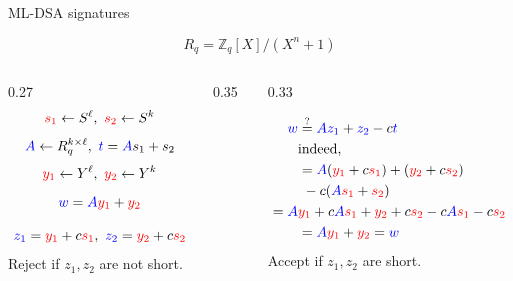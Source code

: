 \documentclass{beamer}
\theoremstyle{customstyle}
\begin{document}
\begin{frame}{ML-DSA signatures}
\scriptsize

$$R_q = \mathbb{Z}_q[X]/(X^n+1)$$

\begin{columns}[c,onlytextwidth]

\begin{column}{0.27\textwidth}
\vspace*{-1.8cm}
$$\textcolor{red}{s_1} \leftarrow S^\ell,~ \textcolor{red}{s_2} \leftarrow S^k$$
  $$\textcolor{blue}{A} \leftarrow R_q^{k\times\ell},~ \textcolor{blue}{t} = \textcolor{blue}{A}s_1+s_2$$
  $$\textcolor{red}{y_1}\leftarrow Y^\ell,~ \textcolor{red}{y_2}\leftarrow Y^k$$
  $$\textcolor{blue}{w} = \textcolor{blue}{A}\textcolor{red}{y_1}+\textcolor{red}{y_2}$$

  $$\textcolor{blue}{z_1}=\textcolor{red}{y_1}+c\textcolor{red}{s_1},~ \textcolor{blue}{z_2}=\textcolor{red}{y_2}+c\textcolor{red}{s_2}$$
  Reject if $z_1,z_2$ are not short.
\end{column}


\begin{column}{0.35\textwidth}

\hspace*{-1.0cm}

\end{column}

\begin{column}{0.33\textwidth}


\vspace*{2.5cm}
  \begin{align*}
  \textcolor{blue}{w} &\stackrel{?}{=} \textcolor{blue}{Az_1}+\textcolor{blue}{z_2}-c \textcolor{blue}{t} \\
      &\text{indeed,}\\
      &= \textcolor{blue}{A}(\textcolor{red}{y_1}+c\textcolor{red}{s_1})+(\textcolor{red}{y_2}+c\textcolor{red}{s_2}) \\
      &~-c(\textcolor{blue}{A} \textcolor{red}{s_1}+\textcolor{red}{s_2}) \\
    =\textcolor{blue}{A} &\textcolor{red}{y_1} +c \textcolor{blue}{A} \textcolor{red}{s_1} +\textcolor{red}{y_2} +c \textcolor{red}{s_2}-c\textcolor{blue}{A} \textcolor{red}{s_1}-c\textcolor{red}{s_2}\\
			 &= \textcolor{blue}{A} \textcolor{red}{y_1}+\textcolor{red}{y_2} = \textcolor{blue}{w}
  \end{align*}
  Accept if $z_1,z_2$ are short.

\end{column}
\end{columns}
\end{frame}
\end{document}
